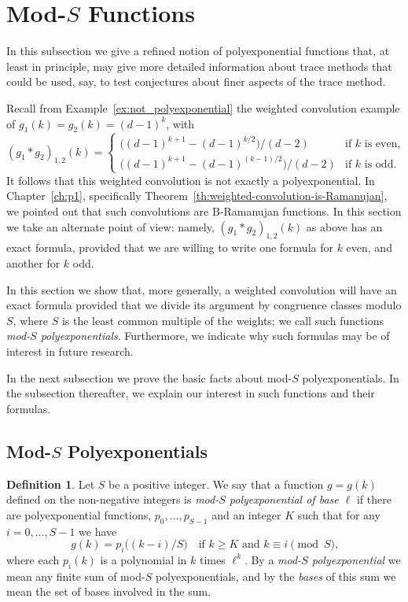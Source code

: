 \documentclass{memo-l}
\newenvironment{jfnote}{ \bgroup \color{blue} }{\egroup}
\newcommand{\mynote}[1]{\begin{jfnote}#1\end{jfnote}}
\theoremstyle{plain}
\theoremstyle{definition}
\newtheorem{definition}[theorem]{Definition}
\numberwithin{section}{chapter}
\numberwithin{equation}{chapter}
\theoremstyle{plain}
\theoremstyle{definition}
\begin{document}
\section{Mod-$S$ Functions}
\label{se:p2-modl}



In this subsection we give a refined notion of polyexponential
functions that, at least in principle, may give more detailed
information about trace methods that could be used, say,
to test conjectures about finer aspects of the trace method.


Recall 
from Example~\ref{ex:not_polyexponential}
the weighted convolution example of
$g_1(k)=g_2(k)=(d-1)^k$, with
$$
(g_1 * g_2 )_{1,2}(k) = 
\left\{ \begin{array}{ll} \bigl( (d-1)^{k+1}-(d-1)^{k/2} \bigr)/(d-2)
& \mbox{if $k$ is even,} \\ 
\bigl( (d-1)^{k+1}-(d-1)^{(k-1)/2} \bigr)/(d-2) 
& \mbox{if $k$ is odd.}  \end{array}
\right.
$$
It follows that this weighted convolution is not exactly a polyexponential.
In Chapter~\ref{ch:p1}, specifically
Theorem~\ref{th:weighted-convolution-is-Ramanujan}, we pointed
out that such convolutions are \glspl{B-Ramanujan function}.
In this section we take an alternate point of view: namely, 
$(g_1 \ast g_2)_{1,2}(k)$ as above has an exact formula, provided that
we are willing to write one formula for $k$ even, and another for
$k$ odd.

In this section we show that,
more generally, a weighted convolution will have an exact formula provided
that we divide its argument by
congruence classes modulo $S$,
where $S$ is the least common multiple of the weights;
we call such functions {\em mod-$S$ polyexponentials}.
Furthermore, we indicate why such formulas may be of interest in
future research.

In the next subsection we prove the basic
facts about mod-$S$ polyexponentials.  
In the subsection thereafter, we explain our interest in such functions
and their formulas.



\subsection{Mod-$S$ Polyexponentials}

\begin{definition}
Let $S$ be a positive integer.
We say
that a function $g=g(k)$ defined on the non-negative
integers is {\em mod-$S$ polyexponential of base $\ell$} if
there are polyexponential functions, $p_0,\ldots,p_{S-1}$ and
an integer $K$ such that for any $i=0,\ldots,S-1$ we have
$$
g(k) = p_i\bigl( (k-i)/S \bigr) \quad
\mbox{if $k\ge K$ and $k\equiv i\pmod{S}$,}
$$
where each $p_i(k)$ is a polynomial in $k$ times $\ell^k$.
By a {\em mod-$S$ polyexponential} we mean any finite sum of
mod-$S$ polyexponentials,
and by the {\em bases} of this sum we mean the set of bases
involved in the sum.
\end{definition}
\end{document}
